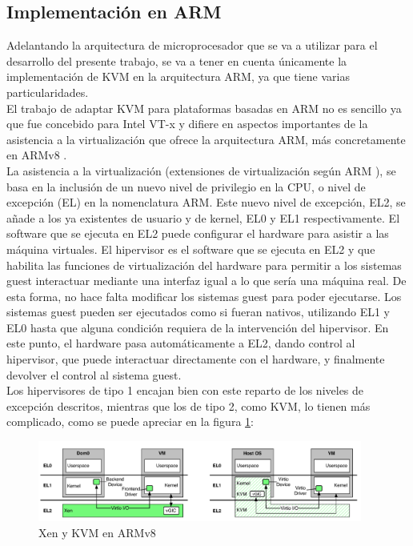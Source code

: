 \subsection{Implementación en ARM}
Adelantando la arquitectura de microprocesador que se va a utilizar para el desarrollo del presente trabajo, se va a tener en cuenta únicamente la implementación de KVM en la arquitectura ARM, ya que tiene varias particularidades.\\
El trabajo de adaptar KVM para plataformas basadas en ARM no es sencillo ya que fue concebido para Intel VT-x y difiere en aspectos importantes de la asistencia a la virtualización que ofrece la arquitectura ARM, más concretamente en ARMv8 \cite{kvm_1}.\\
La asistencia a la virtualización (extensiones de virtualización según ARM \cite{armv8_virt}), se basa en la inclusión de un nuevo nivel de privilegio en la CPU, o nivel de excepción (EL) en la nomenclatura ARM. Este nuevo nivel de excepción, EL2, se añade a los ya existentes de usuario y de kernel, EL0 y EL1 respectivamente.
El software que se ejecuta en EL2 puede configurar el hardware para asistir a las máquina virtuales. El hipervisor es el software que se ejecuta en EL2 y que habilita las funciones de virtualización del hardware para permitir a los sistemas guest interactuar mediante una interfaz igual a lo que sería una máquina real. De esta forma, no hace falta modificar los sistemas guest para poder ejecutarse. Los sistemas guest pueden ser ejecutados como si fueran nativos, utilizando EL1 y EL0 hasta que alguna condición requiera de la intervención del hipervisor. En este punto, el hardware pasa automáticamente a EL2, dando control al hipervisor, que puede interactuar directamente con el hardware, y finalmente devolver el control al sistema guest.\\
Los hipervisores de tipo 1 encajan bien con este reparto de los niveles de excepción descritos, mientras que los de tipo 2, como KVM, lo tienen más complicado, como se puede apreciar en la figura \ref{fig:kvm_and_xen}:

\begin{figure}[!htb]
  \centering
  \includegraphics[width=0.95\textwidth]{recursos/kvm_xen_1.png}
  \caption{Xen y KVM en ARMv8}
  \label{fig:kvm_and_xen}
\end{figure}

